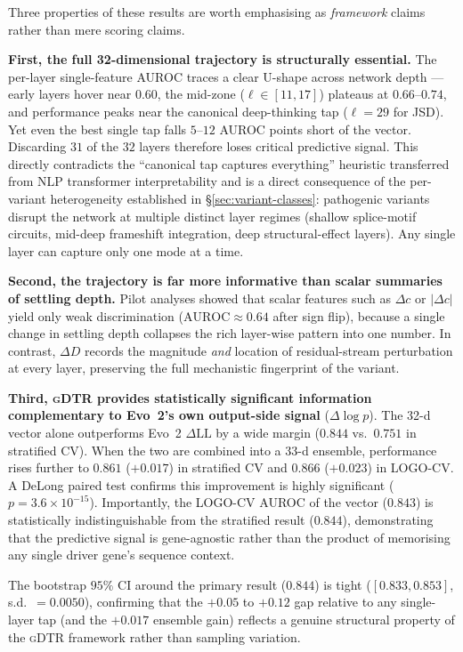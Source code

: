 \documentclass[12pt]{article}
\theoremstyle{plain}
\theoremstyle{definition}
\theoremstyle{remark}
\newcommand{\gDTR}{\textsc{gDTR}}
\begin{document}
Three properties of these results are worth emphasising as
\emph{framework} claims rather than mere scoring claims.

\textbf{First, the full 32-dimensional trajectory is structurally
essential.} The per-layer single-feature AUROC traces a clear U-shape
across network depth --- early layers hover near $0.60$, the mid-zone
($\ell\in[11,17]$) plateaus at $0.66$--$0.74$, and performance peaks
near the canonical deep-thinking tap ($\ell=29$ for JSD). Yet even the
best single tap falls $5$--$12$ AUROC points short of the vector.
Discarding $31$ of the $32$ layers therefore loses critical predictive
signal. This directly contradicts the ``canonical tap captures
everything'' heuristic transferred from NLP transformer interpretability
and is a direct consequence of the per-variant heterogeneity established
in \S\ref{sec:variant-classes}: pathogenic variants disrupt the network
at multiple distinct layer regimes (shallow splice-motif circuits,
mid-deep frameshift integration, deep structural-effect layers). Any
single layer can capture only one mode at a time.

\textbf{Second, the trajectory is far more informative than scalar
summaries of settling depth.} Pilot analyses showed that scalar
features such as $\Delta c$ or $|\Delta c|$ yield only weak
discrimination ($\mathrm{AUROC}\approx 0.64$ after sign flip), because
a single change in settling depth collapses the rich layer-wise
pattern into one number. In contrast, $\Delta D$ records the magnitude
\emph{and} location of residual-stream perturbation at every layer,
preserving the full mechanistic fingerprint of the variant.

\textbf{Third, \gDTR{} provides statistically significant information
complementary to Evo~2's own output-side signal} ($\Delta\log p$). The
32-d vector alone outperforms Evo~2 $\Delta\mathrm{LL}$ by a wide
margin ($0.844$ vs.\ $0.751$ in stratified CV). When the two are
combined into a 33-d ensemble, performance rises further to $0.861$
($+0.017$) in stratified CV and $0.866$ ($+0.023$) in LOGO-CV. A DeLong
paired test \cite{delong1988comparing} confirms this improvement is
highly significant ($p=3.6\times 10^{-15}$). Importantly, the LOGO-CV
AUROC of the vector ($0.843$) is statistically indistinguishable from
the stratified result ($0.844$), demonstrating that the predictive
signal is gene-agnostic rather than the product of memorising any
single driver gene's sequence context.

The bootstrap $95\%$ CI around the primary result ($0.844$) is tight
($[0.833, 0.853]$, s.d.\ $=0.0050$), confirming that the $+0.05$ to
$+0.12$ gap relative to any single-layer tap (and the $+0.017$ ensemble
gain) reflects a genuine structural property of the \gDTR{} framework
rather than sampling variation.
\end{document}
